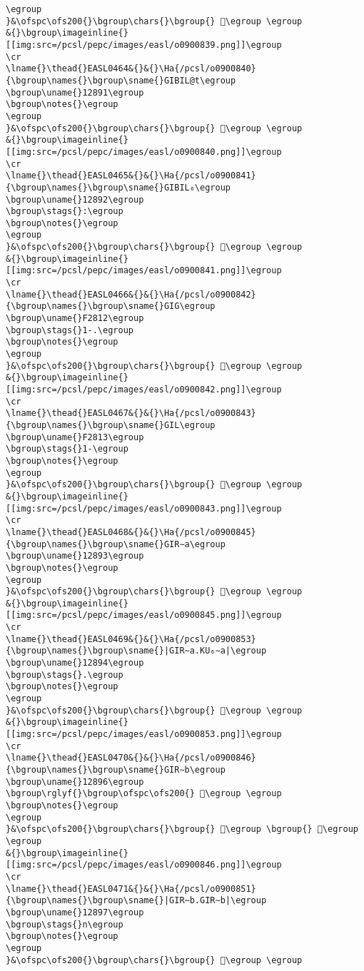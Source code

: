 \begin{verbatim}
\egroup
}&\ofspc\ofs200{}\bgroup\chars{}\bgroup{} 𒢐\egroup \egroup
&{}\bgroup\imageinline{}[[img:src=/pcsl/pepc/images/easl/o0900839.png]]\egroup
\cr
\lname{}\thead{}EASL0464&{}&{}\Ha{/pcsl/o0900840}{\bgroup\names{}\bgroup\sname{}GIBIL@t\egroup
\bgroup\uname{}12891\egroup
\bgroup\notes{}\egroup
\egroup
}&\ofspc\ofs200{}\bgroup\chars{}\bgroup{} 𒢑\egroup \egroup
&{}\bgroup\imageinline{}[[img:src=/pcsl/pepc/images/easl/o0900840.png]]\egroup
\cr
\lname{}\thead{}EASL0465&{}&{}\Ha{/pcsl/o0900841}{\bgroup\names{}\bgroup\sname{}GIBIL₆\egroup
\bgroup\uname{}12892\egroup
\bgroup\stags{}:\egroup
\bgroup\notes{}\egroup
\egroup
}&\ofspc\ofs200{}\bgroup\chars{}\bgroup{} 𒢒\egroup \egroup
&{}\bgroup\imageinline{}[[img:src=/pcsl/pepc/images/easl/o0900841.png]]\egroup
\cr
\lname{}\thead{}EASL0466&{}&{}\Ha{/pcsl/o0900842}{\bgroup\names{}\bgroup\sname{}GIG\egroup
\bgroup\uname{}F2812\egroup
\bgroup\stags{}1-.\egroup
\bgroup\notes{}\egroup
\egroup
}&\ofspc\ofs200{}\bgroup\chars{}\bgroup{} 󲠒\egroup \egroup
&{}\bgroup\imageinline{}[[img:src=/pcsl/pepc/images/easl/o0900842.png]]\egroup
\cr
\lname{}\thead{}EASL0467&{}&{}\Ha{/pcsl/o0900843}{\bgroup\names{}\bgroup\sname{}GIL\egroup
\bgroup\uname{}F2813\egroup
\bgroup\stags{}1-\egroup
\bgroup\notes{}\egroup
\egroup
}&\ofspc\ofs200{}\bgroup\chars{}\bgroup{} 󲠓\egroup \egroup
&{}\bgroup\imageinline{}[[img:src=/pcsl/pepc/images/easl/o0900843.png]]\egroup
\cr
\lname{}\thead{}EASL0468&{}&{}\Ha{/pcsl/o0900845}{\bgroup\names{}\bgroup\sname{}GIR∼a\egroup
\bgroup\uname{}12893\egroup
\bgroup\notes{}\egroup
\egroup
}&\ofspc\ofs200{}\bgroup\chars{}\bgroup{} 𒢓\egroup \egroup
&{}\bgroup\imageinline{}[[img:src=/pcsl/pepc/images/easl/o0900845.png]]\egroup
\cr
\lname{}\thead{}EASL0469&{}&{}\Ha{/pcsl/o0900853}{\bgroup\names{}\bgroup\sname{}|GIR∼a.KU₆∼a|\egroup
\bgroup\uname{}12894\egroup
\bgroup\stags{}.\egroup
\bgroup\notes{}\egroup
\egroup
}&\ofspc\ofs200{}\bgroup\chars{}\bgroup{} 𒢔\egroup \egroup
&{}\bgroup\imageinline{}[[img:src=/pcsl/pepc/images/easl/o0900853.png]]\egroup
\cr
\lname{}\thead{}EASL0470&{}&{}\Ha{/pcsl/o0900846}{\bgroup\names{}\bgroup\sname{}GIR∼b\egroup
\bgroup\uname{}12896\egroup
\bgroup\rglyf{}\bgroup\ofspc\ofs200{} 𒢖\egroup \egroup
\bgroup\notes{}\egroup
\egroup
}&\ofspc\ofs200{}\bgroup\chars{}\bgroup{} 𒢕\egroup \bgroup{} 𒢖\egroup \egroup
&{}\bgroup\imageinline{}[[img:src=/pcsl/pepc/images/easl/o0900846.png]]\egroup
\cr
\lname{}\thead{}EASL0471&{}&{}\Ha{/pcsl/o0900851}{\bgroup\names{}\bgroup\sname{}|GIR∼b.GIR∼b|\egroup
\bgroup\uname{}12897\egroup
\bgroup\stags{}n\egroup
\bgroup\notes{}\egroup
\egroup
}&\ofspc\ofs200{}\bgroup\chars{}\bgroup{} 𒢗\egroup \egroup

\end{verbatim}
